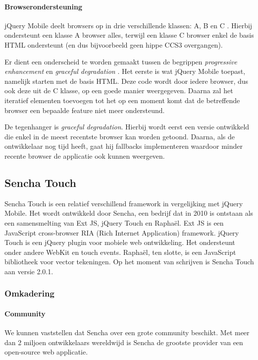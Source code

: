 \paragraph{Browserondersteuning}
\label{sec:jqm-browser-support}
jQuery Mobile deelt browsers op in drie verschillende klassen: A, B en C \cite{JQuery2012d}. Hierbij ondersteunt een klasse A browser alles, terwijl een klasse C browser enkel de basis HTML ondersteunt (en dus bijvoorbeeld geen hippe CCS3 overgangen).

Er dient een onderscheid te worden gemaakt tussen de begrippen \emph{progressive enhancement} en \emph{graceful degradation} \cite{Hens2012}. Het eerste is wat jQuery Mobile toepast, namelijk starten met de basis HTML. Deze code wordt door iedere browser, dus ook deze uit de C klasse, op een goede manier weergegeven. Daarna zal het iteratief elementen toevoegen tot het op een moment komt dat de betreffende browser een bepaalde feature niet meer ondersteund.

De tegenhanger is \emph{graceful degradation}. Hierbij wordt eerst een versie ontwikkeld die enkel in de meest recentste browser kan worden getoond. Daarna, als de ontwikkelaar nog tijd heeft, gaat hij fallbacks implementeren waardoor minder recente browser de applicatie ook kunnen weergeven.


\subsection{Sencha Touch}

Sencha Touch is een relatief verschillend framework in vergelijking met jQuery Mobile.  Het wordt ontwikkeld door Sencha,  een bedrijf dat in 2010 is ontstaan als een samensmelting van Ext JS,  jQuery Touch en Raphaël.  Ext JS is een JavaScript cross-browser RIA (Rich Internet Application) framework. jQuery Touch is een jQuery plugin voor mobiele web ontwikkeling.  Het ondersteunt onder andere WebKit en touch events.  Raphaël,  ten slotte,  is een JavaScript bibliotheek voor vector tekeningen. Op het moment van schrijven is Sencha Touch aan versie 2.0.1.  

\subsubsection{Omkadering}
\paragraph{Community}
We kunnen vaststellen dat Sencha over een grote community beschikt.  Met meer dan 2 miljoen ontwikkelaars wereldwijd is Sencha de grootste provider van een open-source web applicatie.  

